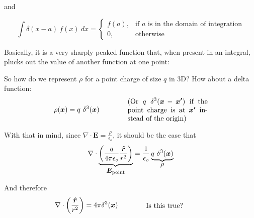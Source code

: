 \documentclass{article}
\begin{document}
and

\begin{equation*}
    \displaystyle \int \delta(x - a)\ f(x)\ dx = \begin{cases} \displaystyle f(a), & \text{if } a \text{ is in the domain of integration} \\ \displaystyle 0, & \text{otherwise} \end{cases}
\end{equation*}


Basically, it is a very sharply peaked function that, when present in an integral, plucks out the value of another function at one point:

\begin{figure}[H]
\centering
{}
\label{fig:3:delta}
\end{figure}

So how do we represent $\rho$ for a point charge of size $q$ in 3D? How about a delta function:
\begin{equation*}
    \rho(\bm{x}) = q\ \delta^3(\bm{x}) \qquad\qquad \parbox[c]{0.33\textwidth}{(Or $\displaystyle q\ \delta^3(\bm{x} - \bm{x'})$ if the point charge is at $\bm{x'}$ instead of the origin)}
\end{equation*}

With that in mind, since $\displaystyle \nabla \cdot \bm{E} = \frac{\rho}{\epsilon_o}$, it should be the case that
\begin{equation*}
    \nabla \cdot \underbrace{\left( \frac{q}{4\pi\epsilon_o} \frac{\bm{\hat{r}}}{r^2} \right)}_{\displaystyle \bm{E}_{\text{point}}} = \frac{1}{\epsilon_o} \underbrace{q\ \delta^3(\bm{x})}_{\displaystyle \rho}
\end{equation*}

And therefore
\begin{equation*}
    \nabla \cdot \left( \frac{\rhat}{r^2} \right) = 4\pi\delta^3(\bm{x}) \qquad\qquad \parbox[c]{0.25\textwidth}{Is this true?}
\end{equation*}
\end{document}
